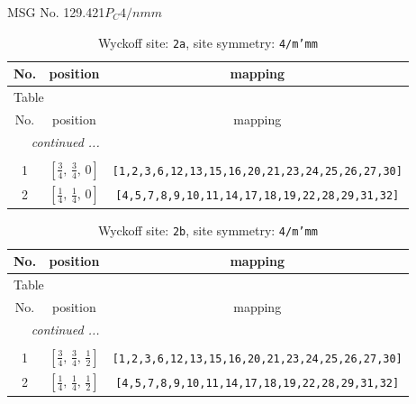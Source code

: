 \documentclass[fleqn,8pt]{jsarticle}
\begin{document}
\setcounter{MaxMatrixCols}{32}

\renewcommand{\tablename}{Table~}
\renewcommand{\figurename}{Figure~}
\begin{center}
\LARGE
MSG No. 129.421\quad$P_{C}4/nmm$
\end{center}
\renewcommand{\arraystretch}{1.2}
\begin{longtable}{ccc}
\caption{Wyckoff site: {\tt 2a}, site symmetry: {\tt 4/m'mm}}
 \\
 \hline \hline
No. & position & mapping \\ \hline \endfirsthead

\multicolumn{2}{l}{\tablename\ \thetable{}} \\
 \hline \hline
No. & position & mapping \\ \hline \endhead

 \hline \hline
\multicolumn{2}{r}{\footnotesize\it continued ...} \\ \endfoot

 \hline \hline
\multicolumn{2}{r}{} \\ \endlastfoot

1 & $\left[ \frac{3}{4},\, \frac{3}{4},\, 0 \right]$ & {\tt [1,2,3,6,12,13,15,16,20,21,23,24,25,26,27,30]} \\ \hline
2 & $\left[ \frac{1}{4},\, \frac{1}{4},\, 0 \right]$ & {\tt [4,5,7,8,9,10,11,14,17,18,19,22,28,29,31,32]} \\
\end{longtable}
\renewcommand{\arraystretch}{1.2}
\begin{longtable}{ccc}
\caption{Wyckoff site: {\tt 2b}, site symmetry: {\tt 4/m'mm}}
 \\
 \hline \hline
No. & position & mapping \\ \hline \endfirsthead

\multicolumn{2}{l}{\tablename\ \thetable{}} \\
 \hline \hline
No. & position & mapping \\ \hline \endhead

 \hline \hline
\multicolumn{2}{r}{\footnotesize\it continued ...} \\ \endfoot

 \hline \hline
\multicolumn{2}{r}{} \\ \endlastfoot

1 & $\left[ \frac{3}{4},\, \frac{3}{4},\, \frac{1}{2} \right]$ & {\tt [1,2,3,6,12,13,15,16,20,21,23,24,25,26,27,30]} \\ \hline
2 & $\left[ \frac{1}{4},\, \frac{1}{4},\, \frac{1}{2} \right]$ & {\tt [4,5,7,8,9,10,11,14,17,18,19,22,28,29,31,32]} \\
\end{longtable}
\end{document}
